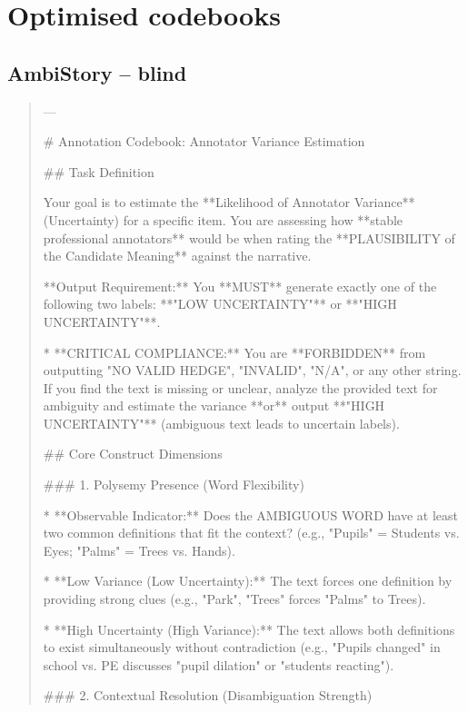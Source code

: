 \section{Optimised codebooks}
\label{app:codebooks}
\subsection*{AmbiStory -- blind}
\begin{quote}\small
---

# Annotation Codebook: Annotator Variance Estimation



## Task Definition

Your goal is to estimate the **Likelihood of Annotator Variance** (Uncertainty) for a specific item. You are assessing how **stable professional annotators** would be when rating the **PLAUSIBILITY of the Candidate Meaning** against the narrative.



**Output Requirement:** You **MUST** generate exactly one of the following two labels: **"LOW UNCERTAINTY"** or **"HIGH UNCERTAINTY"**.

*   **CRITICAL COMPLIANCE:** You are **FORBIDDEN** from outputting "NO VALID HEDGE", "INVALID", "N/A", or any other string. If you find the text is missing or unclear, analyze the provided text for ambiguity and estimate the variance **or** output **"HIGH UNCERTAINTY"** (ambiguous text leads to uncertain labels).



## Core Construct Dimensions



### 1. Polysemy Presence (Word Flexibility)

*   **Observable Indicator:** Does the AMBIGUOUS WORD have at least two common definitions that fit the context? (e.g., "Pupils" = Students vs. Eyes; "Palms" = Trees vs. Hands).

    *   **Low Variance (Low Uncertainty):** The text forces one definition by providing strong clues (e.g., "Park", "Trees" forces "Palms" to Trees).

    *   **High Uncertainty (High Variance):** The text allows both definitions to exist simultaneously without contradiction (e.g., "Pupils changed" in school vs. PE discusses "pupil dilation" or "students reacting").



### 2. Contextual Resolution (Disambiguation Strength)


\end{quote}
